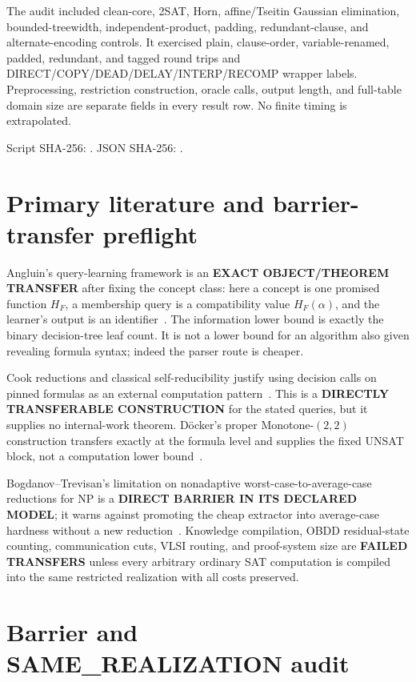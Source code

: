 \documentclass[11pt]{article}
\begin{document}
The audit included clean-core, 2SAT, Horn, affine/Tseitin Gaussian
elimination, bounded-treewidth, independent-product, padding,
redundant-clause, and alternate-encoding controls.  It exercised plain,
clause-order, variable-renamed, padded, redundant, and tagged round trips and
DIRECT/COPY/DEAD/DELAY/INTERP/RECOMP wrapper labels.  Preprocessing,
restriction construction, oracle calls, output length, and full-table domain
size are separate fields in every result row.  No finite timing is
extrapolated.

Script SHA-256:
.
JSON SHA-256:
.

\section{Primary literature and barrier-transfer preflight}
Angluin's query-learning framework is an \textbf{EXACT OBJECT/THEOREM
TRANSFER} after fixing the concept class: here a concept is one promised
function \(H_F\), a membership query is a compatibility value
\(H_F(\alpha)\), and the learner's output is an identifier~\cite{Angluin88}.
The information lower bound is exactly the binary decision-tree leaf count.
It is not a lower bound for an algorithm also given revealing formula syntax;
indeed the parser route is cheaper.

Cook reductions and classical self-reducibility justify using decision calls
on pinned formulas as an external computation pattern~\cite{Cook71,Schnorr76}.
This is a \textbf{DIRECTLY TRANSFERABLE CONSTRUCTION} for the stated queries,
but it supplies no internal-work theorem.  D\"ocker's proper
Monotone-\((2,2)\) construction transfers exactly at the formula level and
supplies the fixed UNSAT block, not a computation lower bound~\cite{Doecker21}.

Bogdanov--Trevisan's limitation on nonadaptive worst-case-to-average-case
reductions for NP is a \textbf{DIRECT BARRIER IN ITS DECLARED MODEL}; it warns
against promoting the cheap extractor into average-case hardness without a
new reduction~\cite{BT06}.  Knowledge compilation, OBDD residual-state
counting, communication cuts, VLSI routing, and proof-system size are
\textbf{FAILED TRANSFERS} unless every arbitrary ordinary SAT computation is
compiled into the same restricted realization with all costs preserved.

\section{Barrier and SAME\_REALIZATION audit}
\end{document}
